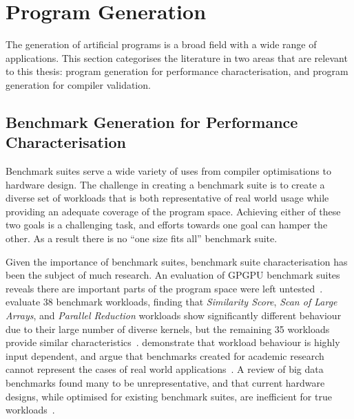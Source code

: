 \section{Program Generation}
\label{sec:related-work-generation}

The generation of artificial programs is a broad field with a wide range of applications. This section categorises the literature in two areas that are relevant to this thesis: program generation for performance characterisation, and program generation for compiler validation.

\subsection{Benchmark Generation for Performance Characterisation}

Benchmark suites serve a wide variety of uses from compiler optimisations to hardware design. The challenge in creating a benchmark suite is to create a diverse set of workloads that is both representative of real world usage while providing an adequate coverage of the program space. Achieving either of these two goals is a challenging task, and efforts towards one goal can hamper the other. As a result there is no ``one size fits all'' benchmark suite.

Given the importance of benchmark suites, benchmark suite characterisation has been the subject of much research. An evaluation of GPGPU benchmark suites reveals there are important parts of the program space were left untested~\cite{Ryoo2015}.
\citeauthor{Goswami2010} evaluate 38 benchmark workloads, finding that \emph{Similarity Score}, \emph{Scan of Large Arrays}, and \emph{Parallel Reduction} workloads show significantly different behaviour due to their large number of diverse kernels, but the remaining 35 workloads provide similar characteristics~\cite{Goswami2010}.
\citeauthor{Xiong2013} demonstrate that workload behaviour is highly input dependent, and argue that benchmarks created for academic research cannot represent the cases of real world applications~\cite{Xiong2013}.
A review of big data benchmarks found many to be unrepresentative, and that current hardware designs, while optimised for existing benchmark suites, are inefficient for true workloads~\cite{Ferdman2012}.

